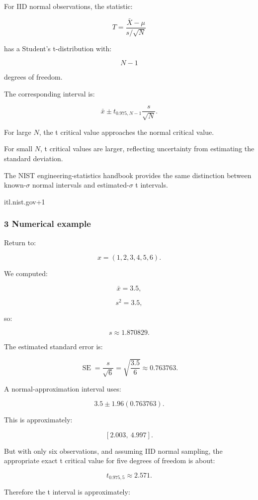 For IID normal observations, the statistic:

\[
 \boxed{ T= \frac{\bar X-\mu}{s/\sqrt N} }
\]

has a Student's t-distribution with:

\[
 N-1
\]

degrees of freedom.

The corresponding interval is:

\[
 \boxed{ \bar x \pm t_{0.975,N-1}\frac{s}{\sqrt N} }.
\]

For large \(N\), the t critical value approaches the normal critical value.

For small \(N\), t critical values are larger, reflecting uncertainty from estimating the standard deviation.

The NIST engineering-statistics handbook provides the same distinction between known-\(\sigma\) normal intervals and estimated-\(\sigma\) t intervals.

itl.nist.gov+1

\subsubsection{3 Numerical example}\label{02-foundations-ii-ch030-numerical-example}

\hypertarget{02-foundations-ii-ch030-numerical-example}{}

Return to:

\[
 x=(1,2,3,4,5,6).
\]

We computed:

\[
 \bar x=3.5,
\]

\[
 s^2=3.5,
\]

so:

\[
 s\approx1.870829.
\]

The estimated standard error is:

\[
 \operatorname{SE}= \frac{s}{\sqrt6} = \sqrt{\frac{3.5}{6}} \approx0.763763.
\]

A normal-approximation interval uses:

\[
 3.5\pm1.96(0.763763).
\]

This is approximately:

\[
 \boxed{[2.003,\ 4.997]}.
\]

But with only six observations, and assuming IID normal sampling, the appropriate exact t critical value for five degrees of freedom is about:

\[
 t_{0.975,5}\approx2.571.
\]

Therefore the t interval is approximately:

